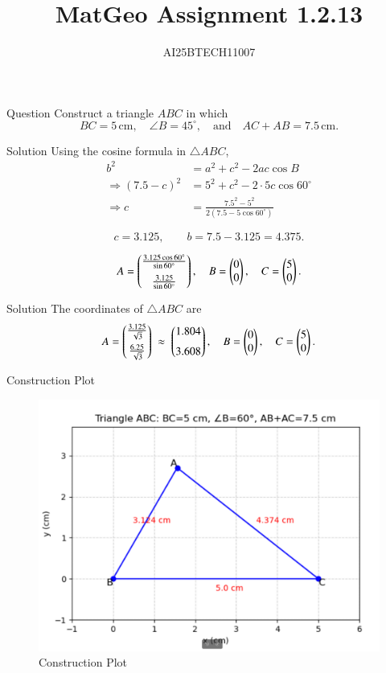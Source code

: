 \documentclass{beamer}
\title 
{MatGeo Assignment 1.2.13}
\author
{AI25BTECH11007}
\begin{document}
\frame{\titlepage}
\begin{frame}{Question}
Construct a triangle $ABC$ in which 
\[
BC = 5 \,\text{cm}, \quad\angle B = 45^\circ, \quad \text{and} \quad AC + AB = 7.5 \,\text{cm}.
\]

\end{frame}

\begin{frame}{Solution}
     Using the cosine formula in $\triangle ABC$,
\begin{align}
b^{2} &= a^{2} + c^{2} - 2ac\cos B \\
\Rightarrow (7.5-c)^{2} &= 5^{2} + c^{2} - 2\cdot 5c \cos 60^\circ \\
\Rightarrow c &= \frac{7.5^{2}-5^{2}}{2(7.5-5\cos 60^\circ)} 
\end{align}

\[
c = 3.125, 
\qquad b = 7.5 - 3.125 = 4.375.
\]

\[
A=\begin{pmatrix}\tfrac{3.125\cos 60^\circ}{\sin 60^\circ}\\[6pt]\tfrac{3.125}{\sin 60^\circ}\end{pmatrix},\quad 
B=\begin{pmatrix}0\\0\end{pmatrix},\quad 
C=\begin{pmatrix}5\\0\end{pmatrix}.
\]
\end{frame}

\begin{frame}{Solution}
The coordinates of $\triangle ABC$ are
\[
A=\begin{pmatrix}\tfrac{3.125}{\sqrt{3}} \\[6pt] \tfrac{6.25}{\sqrt{3}}\end{pmatrix}
\;\approx\;
\begin{pmatrix}1.804 \\[6pt] 3.608\end{pmatrix},\quad
B=\begin{pmatrix}0 \\ 0\end{pmatrix},\quad
C=\begin{pmatrix}5 \\ 0\end{pmatrix}.
\]
\end{frame}

\begin{frame}{Construction Plot}
\begin{figure}
    \centering
    \includegraphics[width=1\linewidth]{figs/image.png}
    \caption{Construction Plot}
    \label{fig:figs/image.png}
\end{figure}
\end{frame}
\end{document}
